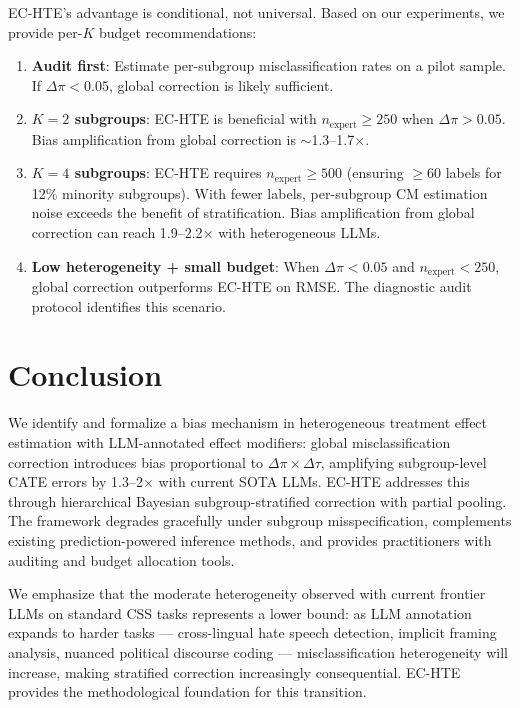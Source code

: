 \documentclass[11pt,a4paper]{article}
\begin{document}
EC-HTE's advantage is conditional, not universal.
Based on our experiments, we provide per-$K$ budget recommendations:

\begin{enumerate}[leftmargin=*,itemsep=2pt]
\item \textbf{Audit first}: Estimate per-subgroup misclassification rates on a pilot sample. If $\Delta\pi < 0.05$, global correction is likely sufficient.
\item \textbf{$K=2$ subgroups}: EC-HTE is beneficial with $n_{\text{expert}} \geq 250$ when $\Delta\pi > 0.05$. Bias amplification from global correction is $\sim$1.3--1.7$\times$.
\item \textbf{$K=4$ subgroups}: EC-HTE requires $n_{\text{expert}} \geq 500$ (ensuring $\geq$60 labels for 12\% minority subgroups). With fewer labels, per-subgroup CM estimation noise exceeds the benefit of stratification. Bias amplification from global correction can reach 1.9--2.2$\times$ with heterogeneous LLMs.
\item \textbf{Low heterogeneity + small budget}: When $\Delta\pi < 0.05$ and $n_{\text{expert}} < 250$, global correction outperforms EC-HTE on RMSE. The diagnostic audit protocol identifies this scenario.
\end{enumerate}

\section{Conclusion}

We identify and formalize a bias mechanism in heterogeneous treatment effect estimation with LLM-annotated effect modifiers: global misclassification correction introduces bias proportional to $\Delta\pi \times \Delta\tau$, amplifying subgroup-level CATE errors by 1.3--2$\times$ with current SOTA LLMs.
EC-HTE addresses this through hierarchical Bayesian subgroup-stratified correction with partial pooling.
The framework degrades gracefully under subgroup misspecification, complements existing prediction-powered inference methods, and provides practitioners with auditing and budget allocation tools.

We emphasize that the moderate heterogeneity observed with current frontier LLMs on standard CSS tasks represents a lower bound: as LLM annotation expands to harder tasks --- cross-lingual hate speech detection, implicit framing analysis, nuanced political discourse coding --- misclassification heterogeneity will increase, making stratified correction increasingly consequential.
EC-HTE provides the methodological foundation for this transition.
\end{document}
